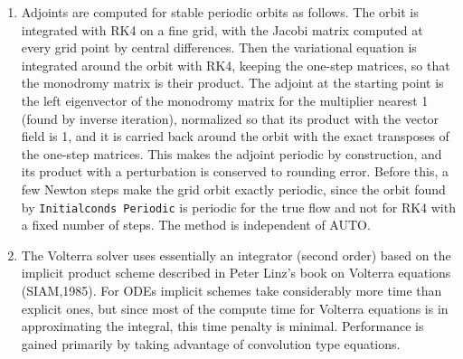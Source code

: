 \documentclass{article}
\begin{document}
\begin{enumerate}
by Tatyana Luzyanina. The linearized stability for a delay equation
results in solving a transcendental equation $f(z)=0.$ The idea is to
use the argument principle and compute the total change in the
argument of $f(z)$ as $z$ goes around a a contour $C.$ The number of
times divided by $2\pi$ tells us the number of roots of $f$ inside the
contour. Thus, XPP simply adds values of the argument of $f(z)$ at
discrete points on a large contour defined by the user and which
encloses a big chunk of the right-half plane.  Obviously the best it
can do is give sufficient conditions for instability as there could
always be roots outside the contour. But it seems to work pretty well
with modest contours except near changes in stability. In addition,
XPP tries to find a specific eigenvalue by using Newton's method on
the characteristic equation. Since there are infinitely many possible
roots to these transcendental equations, the root found can be
arbitrary. However, suppose there is a single pair of roots in the
right-half plane. Then guessing a positive root will often land you on
the desired root. Using the Singular Point Range option will follow
this particular root as a parameter varies. This can often lead to a
discovery of the value of the parameter for which there is a Hopf
bifurcation.
   

\item Adjoints are computed for stable periodic
 orbits as follows.  The orbit is integrated with RK4 on a fine grid, with the Jacobi matrix computed
 at every grid point by central differences.  Then the variational equation is integrated around the orbit with RK4,
 keeping the one-step matrices, so that the monodromy matrix is their product.  The adjoint at the
 starting point is the left eigenvector of the monodromy matrix for the multiplier nearest 1 (found by inverse
 iteration), normalized so that its product with the vector field is 1, and it is carried back around the orbit
 with the exact transposes of the one-step matrices.  This makes the adjoint periodic by construction, and its
 product with a perturbation is conserved to rounding error.  Before this, a few Newton steps make the grid orbit exactly
 periodic, since the orbit found by {\tt Initialconds Periodic} is periodic for the true flow and not for RK4 with a
 fixed number of steps.  The method is independent of AUTO.

\item The Volterra solver uses essentially an integrator (second order)
based on the implicit product scheme described in Peter Linz's book on
Volterra equations (SIAM,1985). For ODEs implicit schemes take
considerably more time than explicit ones, but since most of the
compute time for Volterra equations is in approximating the integral,
this time penalty is minimal.  Performance is gained primarily by
taking advantage of convolution type equations.


\end{enumerate}
\end{document}
